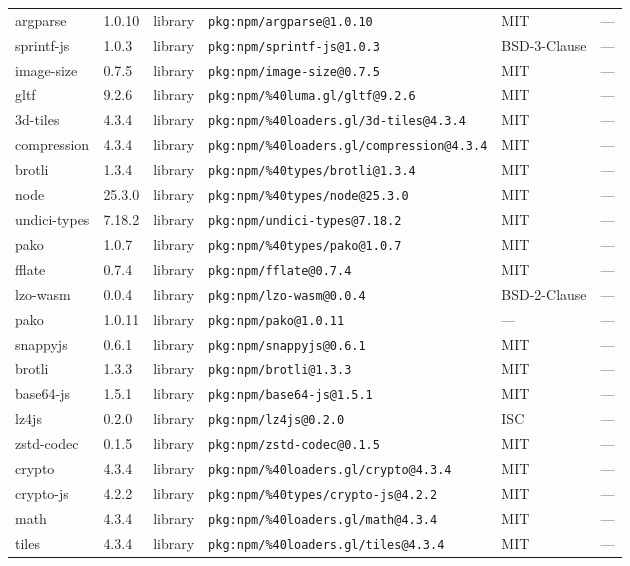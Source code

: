 \documentclass[11pt]{article}
\begin{document}
\begin{longtable}{|l|l|l|p{2.2cm}|l|p{4cm}|}
argparse & 1.0.10 & library & \texttt{pkg:npm/argparse@1.0.10} & MIT & — \\
sprintf-js & 1.0.3 & library & \texttt{pkg:npm/sprintf-js@1.0.3} & BSD-3-Clause & — \\
image-size & 0.7.5 & library & \texttt{pkg:npm/image-size@0.7.5} & MIT & — \\
gltf & 9.2.6 & library & \texttt{pkg:npm/\%40luma.gl/gltf@9.2.6} & MIT & — \\
3d-tiles & 4.3.4 & library & \texttt{pkg:npm/\%40loaders.gl/3d-tiles@4.3.4} & MIT & — \\
compression & 4.3.4 & library & \texttt{pkg:npm/\%40loaders.gl/compression@4.3.4} & MIT & — \\
brotli & 1.3.4 & library & \texttt{pkg:npm/\%40types/brotli@1.3.4} & MIT & — \\
node & 25.3.0 & library & \texttt{pkg:npm/\%40types/node@25.3.0} & MIT & — \\
undici-types & 7.18.2 & library & \texttt{pkg:npm/undici-types@7.18.2} & MIT & — \\
pako & 1.0.7 & library & \texttt{pkg:npm/\%40types/pako@1.0.7} & MIT & — \\
fflate & 0.7.4 & library & \texttt{pkg:npm/fflate@0.7.4} & MIT & — \\
lzo-wasm & 0.0.4 & library & \texttt{pkg:npm/lzo-wasm@0.0.4} & BSD-2-Clause & — \\
pako & 1.0.11 & library & \texttt{pkg:npm/pako@1.0.11} & — & — \\
snappyjs & 0.6.1 & library & \texttt{pkg:npm/snappyjs@0.6.1} & MIT & — \\
brotli & 1.3.3 & library & \texttt{pkg:npm/brotli@1.3.3} & MIT & — \\
base64-js & 1.5.1 & library & \texttt{pkg:npm/base64-js@1.5.1} & MIT & — \\
lz4js & 0.2.0 & library & \texttt{pkg:npm/lz4js@0.2.0} & ISC & — \\
zstd-codec & 0.1.5 & library & \texttt{pkg:npm/zstd-codec@0.1.5} & MIT & — \\
crypto & 4.3.4 & library & \texttt{pkg:npm/\%40loaders.gl/crypto@4.3.4} & MIT & — \\
crypto-js & 4.2.2 & library & \texttt{pkg:npm/\%40types/crypto-js@4.2.2} & MIT & — \\
math & 4.3.4 & library & \texttt{pkg:npm/\%40loaders.gl/math@4.3.4} & MIT & — \\
tiles & 4.3.4 & library & \texttt{pkg:npm/\%40loaders.gl/tiles@4.3.4} & MIT & — \\

\end{longtable}
\end{document}
